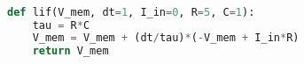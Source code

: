 \begin{lstlisting}[language=Python, caption={Python implementation of the action potential decaying of a LIF: $I_{in} = 0$}, label={lst:membranepotentialdecay}]

def lif(V_mem, dt=1, I_in=0, R=5, C=1):
	tau = R*C
	V_mem = V_mem + (dt/tau)*(-V_mem + I_in*R)
	return V_mem
\end{lstlisting}